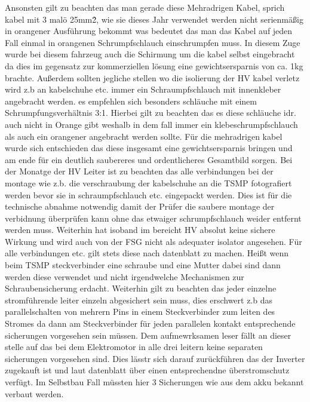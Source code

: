 Ansonsten gilt zu beachten das man gerade diese Mehradrigen Kabel, sprich kabel mit 3 malö 25mm\^2, wie sie dieses Jahr verwendet werden nicht serienmäßig in orangener Ausführung bekommt was bedeutet das man das Kabel auf jeden Fall einmal in orangenen Schrumpfschlauch einschrumpfen muss. In diesem Zuge wurde bei diesem fahrzeug auch die Schirmung um die kabel selbst eingebracht da dies im gegensatz zur kommerziellen lösung eine gewichtsersparnis von ca. 1kg brachte. Außerdem sollten jegliche stellen wo die isolierung der HV kabel verletz wird z.b an kabelschuhe etc. immer ein Schraumpfschlauch mit innenkleber angebracht werden. es empfehlen sich besonders schläuche mit einem Schrumpfungsverhältnis 3:1. Hierbei gilt zu beachten das es diese schläuche idr. auch nicht in Orange gibt weshalb in dem fall immer ein klebeschrumpfschlauch als auch ein orangener angebracht werden sollte. Für die mehradrigen kabel wurde sich entschieden das diese insgesamt eine gewichtsersparnis bringen und am ende für ein deutlich saubereres und ordentlicheres Gesamtbild sorgen. Bei der Monatge der HV Leiter ist zu beachten das alle verbindungen bei der montage wie z.b. die verschraubung der kabelschuhe an die TSMP fotografiert werden bevor sie in schraumpfschlauch etc. eingepackt werden. Dies ist für die technische abnahme notwendig damit der Prüfer die saubere montage der verbidnung überprüfen kann ohne das etwaiger schrumpfschlauch weider entfernt werden muss. Weiterhin hat isoband im bereicht HV absolut keine sichere Wirkung und wird auch von der FSG nicht als adequater isolator angesehen. Für alle verbindungen etc. gilt stets diese nach datenblatt zu machen. Heißt wenn beim TSMP steckverbinder eine schraube und eine Mutter dabei sind dann werden diese verwendet und nicht irgendwelche Mechanismen zur Schraubensicherung erdacht. Weiterhin gilt zu beachten das jeder einzelne stromführende leiter einzeln abgesichert sein muss, dies erschwert z.b das parallelschalten von mehrern Pins in einem Steckverbinder zum leiten des Stromes da dann am Steckverbinder für jeden parallelen kontakt entsprechende sicherungen vorgesehen sein müssen. Dem aufmewrksamen leser fällt an dieser stelle auf das bei dem Elektromotor in alle drei leitern keine separaten sicherungen vorgesehen sind. Dies lässtr sich darauf zurückführen das der Inverter zugekauft ist und laut datenblatt über einen entsprechendne überstromschutz verfügt. Im Selbstbau Fall müssten hier 3 Sicherungen wie aus dem akku bekannt verbaut werden. 
 
